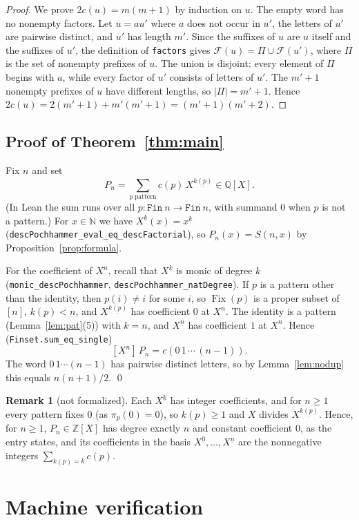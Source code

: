 \documentclass[11pt]{amsart}
\theoremstyle{plain}
\theoremstyle{definition}
\newtheorem{remark}[theorem]{Remark}
\newcommand{\N}{\mathbb{N}}
\newcommand{\Z}{\mathbb{Z}}
\newcommand{\Q}{\mathbb{Q}}
\newcommand{\Fac}{\mathcal{F}}
\newcommand{\Fix}{\operatorname{Fix}}
\newcommand{\ff}[2]{#1^{\underline{#2}}}
\begin{document}
\begin{proof}
We prove $2c(u)=m(m+1)$ by induction on $u$. The empty word has no nonempty factors. Let $u=au'$ where $a$ does not occur in $u'$, the letters of $u'$ are pairwise distinct, and $u'$ has length $m'$. Since the suffixes of $u$ are $u$ itself and the suffixes of $u'$, the definition of \texttt{factors} gives $\Fac(u)=\Pi\cup\Fac(u')$, where $\Pi$ is the set of nonempty prefixes of $u$. The union is disjoint: every element of $\Pi$ begins with $a$, while every factor of $u'$ consists of letters of $u'$. The $m'+1$ nonempty prefixes of $u$ have different lengths, so $|\Pi|=m'+1$. Hence $2c(u)=2(m'+1)+m'(m'+1)=(m'+1)(m'+2)$.
\end{proof}

\subsection{Proof of Theorem~\ref{thm:main}}
Fix $n$ and set
\[
  P_n=\sum_{p\ \text{pattern}} c(p)\,\ff X{k(p)}\in\Q[X].
\]
(In Lean the sum runs over all $p\colon\mathtt{Fin}\ n\to\mathtt{Fin}\ n$, with summand $0$ when $p$ is not a pattern.) For $x\in\N$ we have $\ff Xk(x)=\ff xk$ (\texttt{descPochhammer\_eval\_eq\_descFactorial}), so $P_n(x)=S(n,x)$ by Proposition~\ref{prop:formula}.

For the coefficient of $X^n$, recall that $\ff Xk$ is monic of degree $k$ (\texttt{monic\_descPochhammer}, \texttt{descPochhammer\_natDegree}). If $p$ is a pattern other than the identity, then $p(i)\ne i$ for some $i$, so $\Fix(p)$ is a proper subset of $[n]$, $k(p)<n$, and $\ff X{k(p)}$ has coefficient $0$ at $X^n$. The identity is a pattern (Lemma~\ref{lem:pat}(5)) with $k=n$, and $\ff Xn$ has coefficient $1$ at $X^n$. Hence (\texttt{Finset.sum\_eq\_single})
\[
  [X^n]\,P_n=c(0\,1\,\cdots\,(n-1)).
\]
The word $0\,1\cdots(n-1)$ has pairwise distinct letters, so by Lemma~\ref{lem:nodup} this equals $n(n+1)/2$. \qed

\begin{remark}[not formalized]\label{rem:entry}
Each $\ff Xk$ has integer coefficients, and for $n\ge1$ every pattern fixes $0$ (as $\pi_p(0)=0$), so $k(p)\ge1$ and $X$ divides $\ff X{k(p)}$. Hence, for $n\ge1$, $P_n\in\Z[X]$ has degree exactly $n$ and constant coefficient $0$, as the entry states, and its coefficients in the basis $\ff X0,\dots,\ff Xn$ are the nonnegative integers $\sum_{k(p)=k}c(p)$.
\end{remark}

\section{Machine verification}\label{sec:lean}
\end{document}
